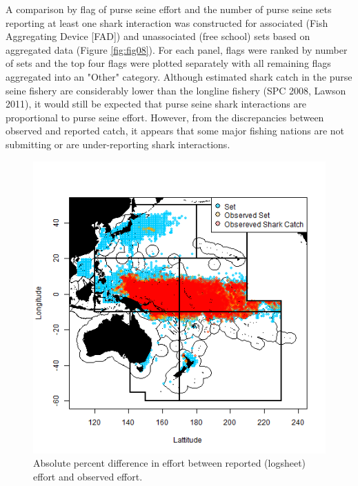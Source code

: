 \documentclass[12pt]{SCreport}
\begin{document}
A comparison by flag of purse seine effort and the number of purse seine sets reporting at least one shark interaction was constructed for associated (Fish Aggregating Device [FAD]) and unassociated (free school) sets based on aggregated data (Figure \ref{fig:fig08}).  For each panel, flags were ranked by number of sets and the top four flags were plotted separately with all remaining flags aggregated into an "Other" category. Although estimated shark catch in the purse seine fishery are considerably lower than the longline fishery (SPC 2008, Lawson 2011), it would still be expected that purse seine shark interactions are proportional to purse seine effort. However, from the discrepancies between observed  and reported catch, it appears that some major fishing nations are not submitting or are under-reporting shark interactions.


\begin{figure}
\begin{center}
\includegraphics[scale=0.75]{../GRAPHICS/Defined/FIG_07_PS_sets}
\caption{\label{fig:fig07} Absolute percent difference in effort between reported (logsheet)  effort and observed effort.}
\end{center}
\end{figure}
\end{document}
